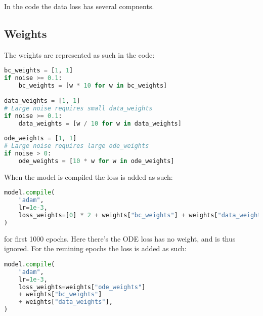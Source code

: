 \documentclass[a4paper]{article}
\begin{document}
In the code the data loss has several compnents. 




\subsection{Weights}

The weights are represented as such in the code:
\begin{lstlisting}[language=python]
bc_weights = [1, 1]
if noise >= 0.1:
	bc_weights = [w * 10 for w in bc_weights]
	
data_weights = [1, 1]
# Large noise requires small data_weights
if noise >= 0.1:
	data_weights = [w / 10 for w in data_weights]
	
ode_weights = [1, 1]
# Large noise requires large ode_weights
if noise > 0:
	ode_weights = [10 * w for w in ode_weights]
\end{lstlisting}

When the model is compiled the loss is added as such:
\begin{lstlisting}[language=python]
model.compile(
	"adam",
	lr=1e-3,
	loss_weights=[0] * 2 + weights["bc_weights"] + weights["data_weights"],
)
\end{lstlisting}
for first 1000 epochs. Here there's the ODE loss has no weight, and is thus ignored. 
For the remining epochs the loss is added as such:
\begin{lstlisting}[language=python]
model.compile(
	"adam",
	lr=1e-3,
	loss_weights=weights["ode_weights"]
	+ weights["bc_weights"]
	+ weights["data_weights"],
)
\end{lstlisting}
















	
\end{document}
